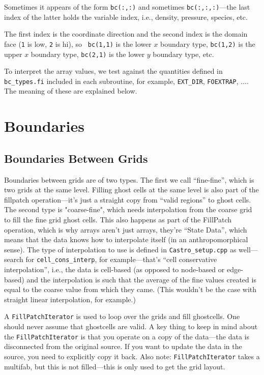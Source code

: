 \begin{itemize}
\begin{itemize}
    Sometimes it appears of the form {\tt bc(:,:)} and sometimes
    {\tt bc(:,:,:)}---the last index of the latter holds the variable
    index, i.e., density, pressure, species, etc.

    The first index is the coordinate direction and the second index
    is the domain face ({\tt 1} is low, {\tt 2} is hi), so {\tt
    bc(1,1)} is the lower $x$ boundary type, {\tt bc(1,2)} is
    the upper $x$ boundary type, {\tt bc(2,1)} is the lower
    $y$ boundary type, etc.

    To interpret the array values, we test against the quantities
    defined in {\tt bc\_types.fi} included in each subroutine,
    for example, {\tt EXT\_DIR}, {\tt FOEXTRAP}, $\ldots$.  The
    meaning of these are explained below.
      
  \end{itemize}
    
\end{itemize}


\section{Boundaries}
\subsection{Boundaries Between Grids}
Boundaries between grids are of two types. The first we call
``fine-fine'', which is two grids at the same level.  Filling ghost
cells at the same level is also part of the fillpatch operation---it's
just a straight copy from ``valid regions'' to ghost cells. The second
type is "coarse-fine", which needs interpolation from the coarse grid
to fill the fine grid ghost cells.  This also happens as part of the
FillPatch operation, which is why arrays aren't just arrays, they're
``State Data'', which means that the data knows how to interpolate
itself (in an anthropomorphical sense).  The type of interpolation to
use is defined in {\tt Castro\_setup.cpp} as well---search for
{\tt cell\_cons\_interp}, for example---that's ``cell conservative
interpolation'', i.e., the data is cell-based (as opposed to node-based
or edge-based) and the interpolation is such that the average of the
fine values created is equal to the coarse value from which they came.
(This wouldn't be the case with straight linear interpolation, for
example.)

A {\tt FillPatchIterator} is used to loop over the grids and fill
ghostcells.  One should never assume that ghostcells are valid.  A key
thing to keep in mind about the {\tt FillPatchIterator} is that you
operate on a copy of the data---the data is disconnected from the
original source.  If you want to update the data in the source,
you need to explicitly copy it back.  Also note: {\tt FillPatchIterator}
takes a multifab, but this is not filled---this is only used to
get the grid layout.   


